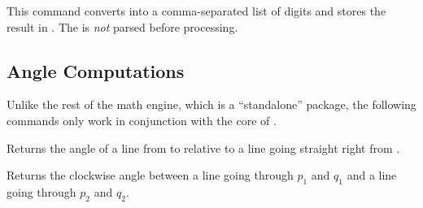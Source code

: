 \begin{command}{\pgfmathtodigitlist{}}
    This command converts  into a comma-separated list of digits
    and stores the result in . The  is \emph{not}
    parsed before processing.
\begin{codeexample}[]
\end{codeexample}
\end{command}


\subsection{Angle Computations}

Unlike the rest of the math engine, which is a ``standalone'' package, the
following commands only work in conjunction with the core of \pgfname.

\begin{command}{\pgfmathanglebetweenpoints{}}
    Returns the angle of a line from  to  relative to a line
    going straight right from .
\begin{codeexample}[]
\pgfmathanglebetweenpoints{\pgfpoint{1cm}{3cm}}{\pgfpoint{2cm}{4cm}}
\pgfmathresult
\end{codeexample}
\end{command}

\begin{command}{\pgfmathanglebetweenlines{}}
    Returns the clockwise angle between a line going through $p_1$ and $q_1$
    and a line going through $p_2$ and $q_2$.
\begin{codeexample}[]
\pgfmathanglebetweenlines{\pgfpoint{1cm}{3cm}}{\pgfpoint{2cm}{4cm}}
                         {\pgfpoint{0cm}{1cm}}{\pgfpoint{1cm}{0cm}}
\pgfmathresult
\end{codeexample}
\end{command}

